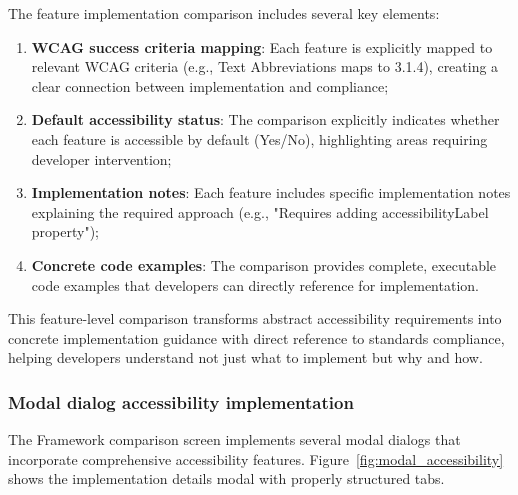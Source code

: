 The feature implementation comparison includes several key elements:

\begin{enumerate}
    \item \textbf{WCAG success criteria mapping}: Each feature is explicitly mapped to relevant WCAG criteria (e.g., Text Abbreviations maps to 3.1.4), creating a clear connection between implementation and compliance;
    
    \item \textbf{Default accessibility status}: The comparison explicitly indicates whether each feature is accessible by default (Yes/No), highlighting areas requiring developer intervention;
    
    \item \textbf{Implementation notes}: Each feature includes specific implementation notes explaining the required approach (e.g., "Requires adding accessibilityLabel property");
    
    \item \textbf{Concrete code examples}: The comparison provides complete, executable code examples that developers can directly reference for implementation.
\end{enumerate}

This feature-level comparison transforms abstract accessibility requirements into concrete implementation guidance with direct reference to standards compliance, helping developers understand not just what to implement but why and how.

\subsubsection{Modal dialog accessibility implementation}

The Framework comparison screen implements several modal dialogs that incorporate comprehensive accessibility features. Figure~\ref{fig:modal_accessibility} shows the implementation details modal with properly structured tabs.

